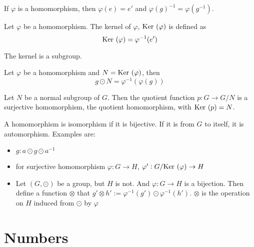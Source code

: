 \begin{theorem}
    If $\varphi$ is a homomorphism, then $\varphi(e) = e'$ and $\varphi(g)^{-1} = \varphi(g^{-1})$.
\end{theorem}

\begin{definition}[kernel]
    Let $\varphi$ be a homomorphism. The kernel of $\varphi$, $\displaystyle \mathrm{Ker}~( \varphi )$ is defined as
    \begin{equation}
        \displaystyle \mathrm{Ker}~( \varphi ) = \varphi^{-1}(e')
    \end{equation}
    
    The kernel is a subgroup.
\end{definition}

\begin{theorem}
Let $\varphi$ be a homomorphism and $N = \displaystyle \mathrm{Ker}~( \varphi )$, then
\begin{equation}
    g \odot N = \varphi^{-1}\left(\varphi(g)\right)
\end{equation}
\end{theorem}

\begin{theorem}
    Let $N$ be a normal subgroup of $G$. Then the quotient function $p: G \rightarrow G/N$ is a surjective homomorphism, the quotient homomorphism, with $\displaystyle \mathrm{Ker}~( p ) = N$.
\end{theorem}


\begin{definition}[isomorphism]
    A homomorphism is isomorphism if it is bijective. If it is from $G$ to itself, it is automorphism. Examples are:
    \begin{itemize}
        \item $g: a \odot g \odot a^{-1}$
        \item for surjective homomorphism $\varphi: G \rightarrow H$, $\varphi' : G/\displaystyle \mathrm{Ker}~( \varphi ) \rightarrow H$
        \item Let $(G, \odot)$ be a group, but $H$ is not. And $\varphi: G \rightarrow H$ is a bijection. Then define a function $\otimes$ that $g' \otimes h' := \varphi^{-1}(g') \odot \varphi^{-1}(h')$. $\otimes$ is the operation on $H$ induced from $\odot$ by $\varphi$
    \end{itemize}
\end{definition}



\section{Numbers}


